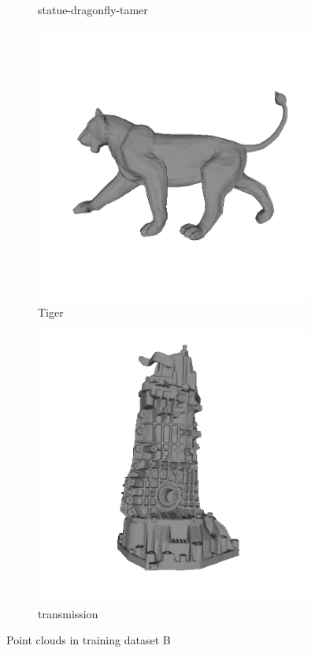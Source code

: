 \begin{figure}
\begin{subfigure}[b]{0.23\linewidth}
		\caption{statue-dragonfly-tamer}
	\end{subfigure}
	\begin{subfigure}[b]{0.23\linewidth}
		\includegraphics[width=\linewidth]{./Figures/train-dataset/38.tiger.png}
		\caption{Tiger}
	\end{subfigure}
	\begin{subfigure}[b]{0.23\linewidth}
		\includegraphics[width=\linewidth]{./Figures/train-dataset/39.transmission.png}
		\caption{transmission}
	\end{subfigure}
	
	
	
	\label{fig:dataset_b}
	\caption{Point clouds in training dataset B }
\end{figure}



